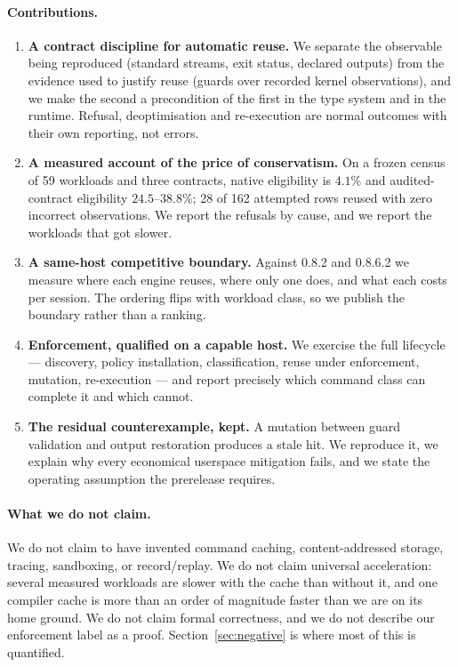\paragraph{Contributions.}
\begin{enumerate}
  \item \textbf{A contract discipline for automatic reuse.} We separate the observable being
  reproduced (standard streams, exit status, declared outputs) from the evidence used to justify
  reuse (guards over recorded kernel observations), and we make the second a precondition of the
  first in the type system and in the runtime. Refusal, deoptimisation and re-execution are normal
  outcomes with their own reporting, not errors.
  \item \textbf{A measured account of the price of conservatism.} On a frozen census of 59
  workloads and three contracts, native eligibility is $4.1\%$ and audited-contract eligibility
  $24.5$--$38.8\%$; 28 of 162 attempted rows reused with zero incorrect observations. We report
  the refusals by cause, and we report the workloads that got slower.
  \item \textbf{A same-host competitive boundary.} Against \firebuild{} 0.8.2 and 0.8.6.2 we
  measure where each engine reuses, where only one does, and what each costs per session. The
  ordering flips with workload class, so we publish the boundary rather than a ranking.
  \item \textbf{Enforcement, qualified on a capable host.} We exercise the full lifecycle ---
  discovery, policy installation, \proven{} classification, reuse under enforcement, mutation,
  re-execution --- and report precisely which command class can complete it and which cannot.
  \item \textbf{The residual counterexample, kept.} A mutation between guard validation and output
  restoration produces a stale hit. We reproduce it, we explain why every economical userspace
  mitigation fails, and we state the operating assumption the prerelease requires.
\end{enumerate}

\paragraph{What we do not claim.}
We do not claim to have invented command caching, content-addressed storage, tracing, sandboxing,
or record/replay. We do not claim universal acceleration: several measured workloads are slower
with the cache than without it, and one compiler cache is more than an order of magnitude faster
than we are on its home ground. We do not claim formal correctness, and we do not describe our
enforcement label as a proof. Section~\ref{sec:negative} is where most of this is quantified.

